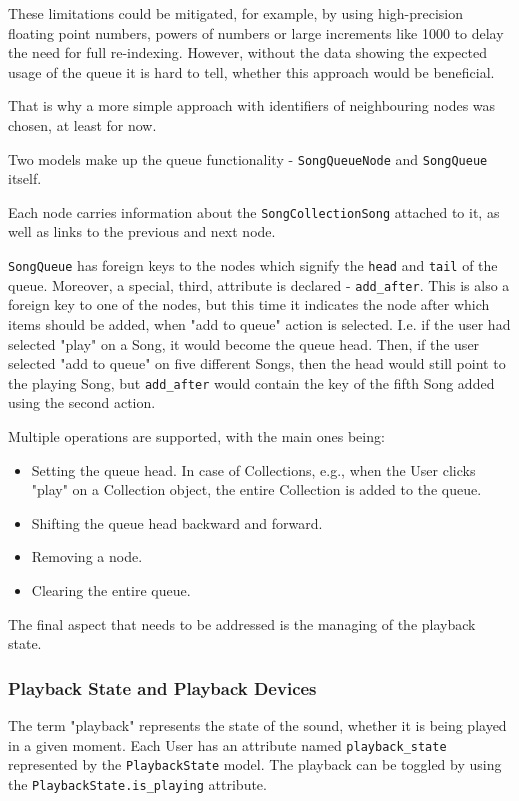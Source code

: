 These limitations could be mitigated, for example, by using high-precision floating point numbers,
powers of numbers or large increments like 1000 to delay the need for full re-indexing.
However, without the data showing the expected usage of the queue it is hard to tell, whether this approach would
be beneficial.

That is why a more simple approach with identifiers of neighbouring nodes was chosen, at least for now.

Two models make up the queue functionality - \texttt{SongQueueNode} and \texttt{SongQueue} itself.

Each node carries information about the \texttt{SongCollectionSong} attached to it, as well as
links to the previous and next node.

\texttt{SongQueue} has foreign keys to the nodes which signify the \texttt{head} and \texttt{tail} of the queue.
Moreover, a special, third, attribute is declared - \texttt{add\_after}. This is also
a foreign key to one of the nodes, but this time it indicates the node after which items
should be added, when "add to queue" action is selected.
I.e. if the user had selected "play" on a Song, it would become the queue head.
Then, if the user selected "add to queue" on five different Songs,
then the head would still point to the playing Song, but \texttt{add\_after} would
contain the key of the fifth Song added using the second action.

Multiple operations are supported, with the main ones being:
\begin{itemize}
    \item Setting the queue head. In case of Collections, e.g.,
    when the User clicks "play" on a Collection object, the entire Collection is added to the queue.
    \item Shifting the queue head backward and forward.
    \item Removing a node.
    \item Clearing the entire queue.
\end{itemize}


The final aspect that needs to be addressed is the managing of the playback state.

\subsubsection{Playback State and Playback Devices}
The term "playback" represents the state of the sound, whether it is being played in a given moment.
Each User has an attribute named \texttt{playback\_state} represented by the \texttt{PlaybackState} model.
The playback can be toggled by using the \texttt{PlaybackState.is\_playing} attribute.

